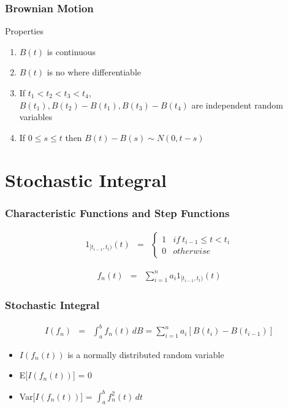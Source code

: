 \documentclass{beamer}   %
\begin{document}
\begin{frame}
    \frametitle{Brownian Motion}
Properties
	\begin{enumerate}[i]
		\item $B(t)$ is continuous
		\item $B(t)$ is no where differentiable
		\item If $t_{1}<t_{2}<t_{3}<t_{4}$, \\
			$B(t_{1}), B(t_{2})-B(t_{1}),  B(t_{3})-B(t_{4})$ are independent random variables
		\item If $0 \le s\le t$ then $B(t)-B(s) \sim N(0, t-s)$
	\end{enumerate}
\end{frame}











\section{Stochastic Integral}
\begin{frame}
    \frametitle{Characteristic Functions and Step Functions}
	\begin{eqnarray}
	1_{[t_{i-1}, t_{t})}(t) &=& \left\{\begin{matrix}
	1 &  if \ t_{i-1} \le t < t_{i}\\ 
	0 &  otherwise
	\end{matrix}\right.
	\end{eqnarray}

	\begin{eqnarray}
		f_{n}(t) &=& \sum_{i=1}^{n} a_{i} 1_{ [t_{i-1} , t_{t} ) }(t)
	\end{eqnarray}

\end{frame}




\begin{frame}
    \frametitle{Stochastic Integral}
	\begin{eqnarray*}
		I(f_{n})&=&\int_{a}^{b}f_{n}(t)\,dB = \sum_{i=1}^{n} a_{i}[B(t_{i})-B(t_{i-1})]	
	\end{eqnarray*}
\begin{itemize}
		\item $I(f_{n}(t))$ is a normally distributed random variable
		\item E[$I(f_{n}(t))$] = 0
		\item Var[$I(f_{n}(t))$] = $\int^b_a f_{n}^{2} (t)\,dt$
	\end{itemize}


\end{frame}
\end{document}
